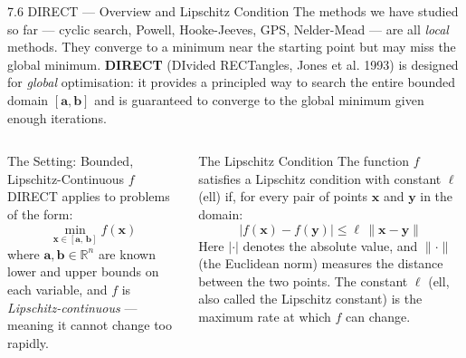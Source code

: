 \documentclass[aspectratio=169,10pt]{beamer}
\begin{document}
\begin{frame}[allowframebreaks]{7.6 DIRECT --- Overview and Lipschitz Condition}
  The methods we have studied so far --- cyclic search, Powell,
  Hooke-Jeeves, GPS, Nelder-Mead --- are all \emph{local} methods.
  They converge to a minimum near the starting point but may miss
  the global minimum.  \textbf{DIRECT} (DIvided RECTangles, Jones et al.
  1993) is designed for \emph{global} optimisation: it provides
  a principled way to search the entire bounded domain
  $[\mathbf{a},\mathbf{b}]$ and is guaranteed to converge to the
  global minimum given enough iterations.

  \begin{columns}[T]
      \begin{block}{The Setting: Bounded, Lipschitz-Continuous $f$}
        DIRECT applies to problems of the form:
        \[
          \min_{\mathbf{x} \in [\mathbf{a},\,\mathbf{b}]} f(\mathbf{x})
        \]
        where $\mathbf{a},\mathbf{b} \in \mathbb{R}^n$ are known lower
        and upper bounds on each variable, and $f$ is
        \emph{Lipschitz-continuous} --- meaning it cannot change too
        rapidly.
      \end{block}

      \begin{block}{The Lipschitz Condition}
        The function $f$ satisfies a Lipschitz condition with constant
        $\ell$ (ell) if, for every pair of points $\mathbf{x}$ and
        $\mathbf{y}$ in the domain:
        \[
          \bigl|f(\mathbf{x}) - f(\mathbf{y})\bigr|
          \le \ell\,\|\mathbf{x} - \mathbf{y}\|
        \]
        Here $|\cdot|$ denotes the absolute value, and
        $\|\cdot\|$ (the Euclidean norm) measures the distance between
        the two points.  The constant $\ell$ (ell, also called the
        Lipschitz constant) is the maximum rate at which $f$ can change.
      \end{block}


\end{columns}
\end{frame}
\end{document}
